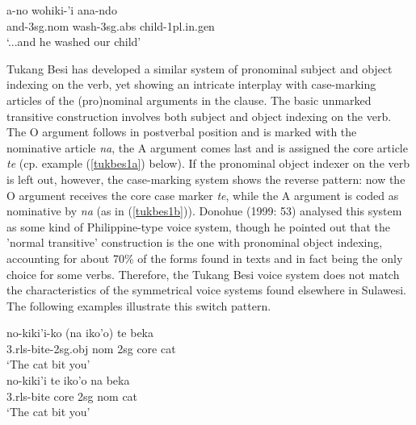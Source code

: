 \ea \label{tolaki1}
\gll a-no wohiki-'i ana-ndo \\
and-\acs{3}\acs{sg}.\acs{nom} wash-\acs{3}\acs{sg}.\acs{abs} child-\acs{1}\acs{pl}.\acs{in}.\acs{gen} \\
\glft `...and he washed our child'  \\ 
\endgl
\xe

Tukang Besi has developed a similar system of pronominal subject and object indexing on the verb, yet showing an intricate interplay with case-marking articles of the (pro)nominal arguments in the clause. The basic unmarked transitive construction involves both subject and object indexing on the verb. The O argument follows in postverbal position and is marked with the nominative article \textit{na}, the A argument comes last and is assigned the core article \textit{te} (cp. example (\ref{tukbes1a}) below). If the pronominal object indexer on the verb is left out, however, the case-marking system shows the reverse pattern: now the O argument receives the core case marker \textit{te}, while the A argument is coded as nominative by \textit{na} (as in (\ref{tukbes1b})). Donohue (1999: 53) analysed this system as some kind of Philippine-type voice system, though he pointed out that the 'normal transitive' construction is the one with pronominal object indexing, accounting for about 70\% of the forms found in texts and in fact being the only choice for some verbs. Therefore, the Tukang Besi voice system does not match the characteristics of the symmetrical voice systems found elsewhere in Sulawesi. The following examples illustrate this switch pattern.

\pex 
\a \label{tukbes1a}
\gll no-kiki'i-ko (na iko'o) te beka \\
\acs{3}.\acs{rls}-bite-\acs{2}\acs{sg}.\acs{obj} \acs{nom} \acs{2}\acs{sg} \acs{core} cat \\
\glft `The cat bit you' \\ 
\endgl
\a \label{tukbes1b}
\gla no-kiki'i te iko'o na beka \\ 
\acs{3}.\acs{rls}-bite \acs{core} \acs{2}\acs{sg} \acs{nom} cat \\
\glft `The cat bit you' \\ 
\endgl
\xe

